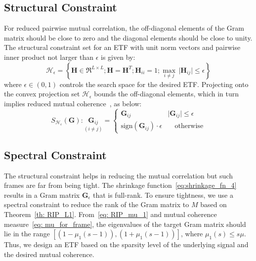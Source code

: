 \subsection{Structural Constraint}
%
For reduced pairwise mutual correlation, the off-diagonal elements of the Gram matrix should be close to zero and the diagonal elements should be close to unity. The structural constraint set for an ETF with unit norm vectors and pairwise inner product not larger than $\epsilon$ is given by:
\begin{equation}
    \label{eq: Projection_set}
    \bm{\mathcal{H}}_{\epsilon} = \left\{ \bm{H}\in\Re^{L \times L};\bm{H}=\bm{H}^{T};\bm{H}_{ii}=1; \underset{i\neq j}{\max}\,\lvert \bm{H}_{ij}\rvert\leq\epsilon\right\}
\end{equation}
%
where $\epsilon\in \left(0,1\right)$ controls the search space for the desired ETF. Projecting onto the convex projection set $\bm{\mathcal{H}}_{\epsilon}$ bounds the off-diagonal elements, which in turn implies reduced mutual coherence~\cite{Elad}, as below:
\begin{equation}
    \label{eq:shrinkage_fn_4}
    S_{\bm{\mathcal{H}}_{\epsilon}}(\bm{G}):\underset{(i\neq j)}{\bm{G}_{ij}} =
    \begin{cases}
      \bm{G}_{ij} & \lvert \bm{G}_{ij}\rvert \leq \epsilon \\
      \text{sign}(\bm{G}_{ij})\cdot\epsilon & \quad \text{otherwise}
    \end{cases}
\end{equation}
%
\subsection{Spectral Constraint}
%
The structural constraint helps in reducing the mutual correlation but such frames are far from being tight. The shrinkage function~\eqref{eq:shrinkage_fn_4} results in a Gram matrix $\bm{G}_{\epsilon}$ that is full-rank. To ensure tightness, we use a spectral constraint to reduce the rank of the Gram matrix to $M$ based on Theorem~\ref{th: RIP_L1}. From~\eqref{eq: RIP_mu_1} and mutual coherence measure~\eqref{eq: mu_for_frame}, the eigenvalues of the target Gram matrix should lie in the range $[(1-\mu_{1}(s-1)), (1+\mu_{1}(s-1))]$, where $\mu_{1}(s)\leq s\mu$. Thus, we design an ETF based on the sparsity level of the underlying signal and the desired mutual coherence. 

